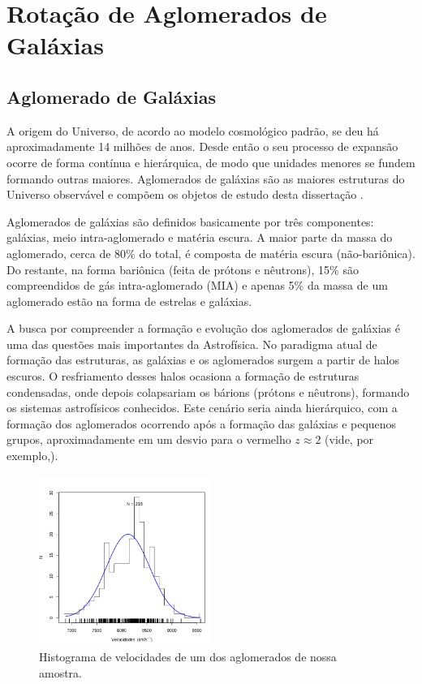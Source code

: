 
\chapter{Rotação de Aglomerados de Galáxias}
\section{Aglomerado de Galáxias}
A origem do Universo, de acordo ao modelo cosmológico padrão, se deu há aproximadamente 14 milhões de anos. Desde então o seu processo de expansão ocorre de forma contínua e hierárquica, de modo que unidades menores se fundem formando outras maiores. Aglomerados de galáxias são as maiores estruturas do Universo observável e compõem os objetos de estudo desta dissertação \cite{ryden2017introduction}. 

Aglomerados de galáxias são definidos basicamente por três componentes: galáxias, meio intra-aglomerado e matéria escura. A maior parte da massa do aglomerado, cerca de 80\% do total, é composta de matéria escura (não-bariônica). Do restante, na forma bariônica (feita de prótons e nêutrons), 15\% são compreendidos de gás intra-aglomerado (MIA) e apenas 5\% da massa de um aglomerado estão na forma de estrelas e galáxias.

A busca por compreender a formação e evolução dos aglomerados de galáxias é uma das questões mais importantes da Astrofísica. No paradigma atual de formação das estruturas, as galáxias e os aglomerados surgem a partir de halos escuros. O resfriamento desses halos ocasiona a formação de estruturas condensadas, onde depois colapsariam os bárions (prótons e nêutrons), formando  os sistemas astrofísicos conhecidos. Este cenário seria ainda hierárquico, com a formação dos aglomerados ocorrendo após a formação das galáxias e pequenos grupos, aproximadamente em um desvio para o vermelho $z \approx 2$ (vide, por exemplo,).

\begin{figure}[H]
	\centering
	\includegraphics[width=0.5\textwidth]{04-figuras/10043dist}
	\caption{Histograma de velocidades de um dos aglomerados de nossa amostra.}
	\label{fig1}
\end{figure}

